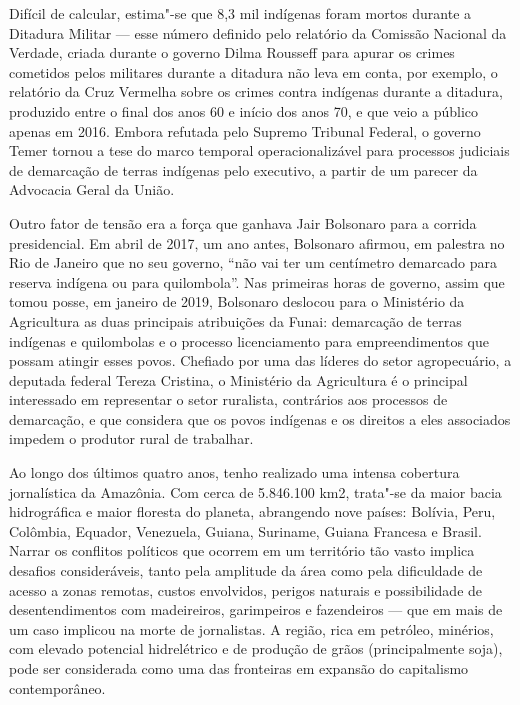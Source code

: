 Difícil de calcular, estima"-se que 8,3 mil indígenas foram mortos
durante a Ditadura Militar --- esse número definido pelo relatório da
Comissão Nacional da Verdade, criada durante o governo Dilma Rousseff
para apurar os crimes cometidos pelos militares durante a ditadura não
leva em conta, por exemplo, o relatório da Cruz Vermelha sobre os crimes
contra indígenas durante a ditadura, produzido entre o final dos anos 60
e início dos anos 70, e que veio a público apenas em 2016. Embora
refutada pelo Supremo Tribunal Federal, o governo Temer tornou a tese do
marco temporal operacionalizável para processos judiciais de demarcação
de terras indígenas pelo executivo, a partir de um parecer da Advocacia
Geral da União.

Outro fator de tensão era a força que ganhava Jair Bolsonaro para a
corrida presidencial. Em abril de 2017, um ano antes, Bolsonaro afirmou,
em palestra no Rio de Janeiro que no seu governo, ``não vai ter um
centímetro demarcado para reserva indígena ou para quilombola''. Nas
primeiras horas de governo, assim que tomou posse, em janeiro de 2019,
Bolsonaro deslocou para o Ministério da Agricultura as duas principais
atribuições da Funai: demarcação de terras indígenas e quilombolas e o
processo licenciamento para empreendimentos que possam atingir esses
povos. Chefiado por uma das líderes do setor agropecuário, a deputada
federal Tereza Cristina, o Ministério da Agricultura é o principal
interessado em representar o setor ruralista, contrários aos processos
de demarcação, e que considera que os povos indígenas e os direitos a
eles associados impedem o produtor rural de trabalhar.

\asterisc

Ao longo dos últimos quatro anos, tenho realizado uma intensa cobertura
jornalística da Amazônia. Com cerca de 5.846.100 km2, trata"-se da maior
bacia hidrográfica e maior floresta do planeta, abrangendo nove países:
Bolívia, Peru, Colômbia, Equador, Venezuela, Guiana, Suriname, Guiana
Francesa e Brasil. Narrar os conflitos políticos que ocorrem em um
território tão vasto implica desafios consideráveis, tanto pela
amplitude da área como pela dificuldade de acesso a zonas remotas,
custos envolvidos, perigos naturais e possibilidade de desentendimentos
com madeireiros, garimpeiros e fazendeiros --- que em mais de um caso
implicou na morte de jornalistas. A região, rica em petróleo, minérios,
com elevado potencial hidrelétrico e de produção de grãos
(principalmente soja), pode ser considerada como uma das fronteiras em
expansão do capitalismo contemporâneo.

